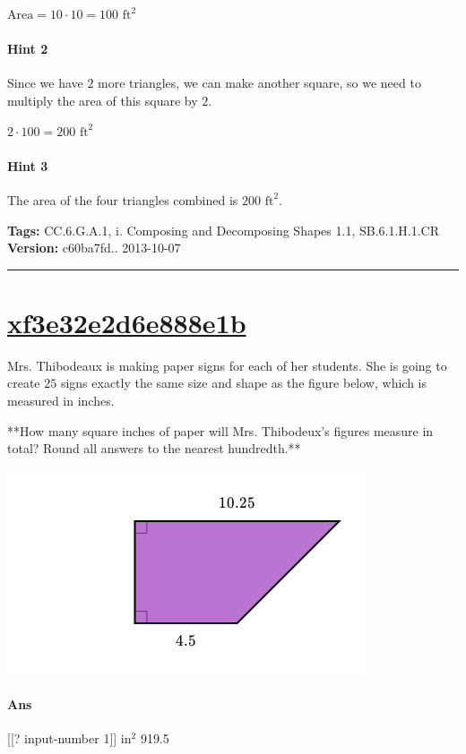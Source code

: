 \documentclass[twocolumn,10pt]{article}
\def\shrinkfactor{0.55}
\begin{document}
${\text{Area}}=10\cdot10=100\text{ ft}^2$  

\paragraph{Hint 2}Since we have $2$ more triangles, we can make another square, so we need to multiply the area of this square by $2$.  

$2\cdot100=200\text{ ft}^2$

\paragraph{Hint 3}The area of the four triangles combined is $200\text{ ft}^2$.



\medskip
\noindent
\textbf{Tags:} {\footnotesize CC.6.G.A.1, i.	Composing and Decomposing Shapes 1.1, SB.6.1.H.1.CR}\\
\textbf{Version:} c60ba7fd.. 2013-10-07
\smallskip\hrule





\section{\href{https://www.khanacademy.org/devadmin/content/items/xf3e32e2d6e888e1b}{xf3e32e2d6e888e1b}}

\noindent
Mrs. Thibodeaux is making paper signs for each of her students.  She is going to create $25$ signs exactly the same size and shape as the figure below, which is measured in inches.  

**How many square inches of paper will Mrs. Thibodeux's figures measure in total?  Round all answers to the nearest hundredth.**


\includegraphics[scale=\shrinkfactor]{figures/d407f53fb7304af1927d6d5c69e50a04498e0eac.png}

\paragraph{Ans}  [[? input-number 1]] $\text{in}^2$  919.5
\end{document}
